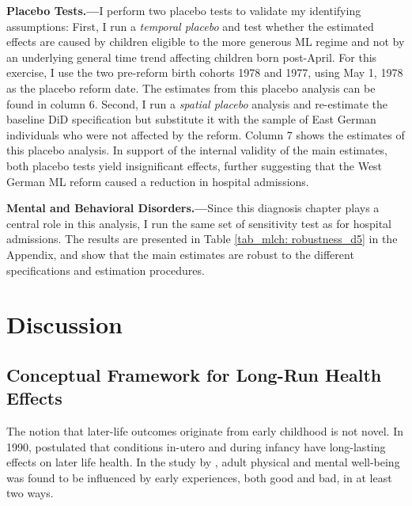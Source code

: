 \textbf{Placebo Tests.---}I perform two placebo tests to validate my identifying assumptions: First, I run a \textit{temporal placebo} and test whether the estimated effects are caused by children eligible to the more generous ML regime and not by an underlying general time trend affecting children born post-April. For this exercise, I use the two pre-reform birth cohorts 1978 and 1977, using May 1, 1978 as the placebo reform date. The estimates from this placebo analysis can be found in column 6. Second, I run a \textit{spatial placebo} analysis and re-estimate the baseline DiD specification but substitute it with the sample of East German individuals who were not affected by the reform. Column 7 shows the estimates of this placebo analysis. In support of the internal validity of the main estimates, both placebo tests yield insignificant effects, 
further suggesting that the West German ML reform caused a reduction in hospital admissions.\newline


\textbf{Mental and Behavioral Disorders.---}Since this diagnosis chapter plays a central role in this analysis, I run the same set of sensitivity test as for hospital admissions. The results are presented in Table \ref{tab_mlch: robustness_d5} in the Appendix, and show that the main estimates are robust to the different specifications and estimation procedures.




\bigskip
\section[Discussion]{Discussion}\label{sec_mlch:discussion}


\subsection{Conceptual Framework for Long-Run Health Effects} \label{rev_mlch: restructure_discussion_framework}
The notion that later-life outcomes originate from early childhood is not novel. In 1990, \citeauthor{Barker1990origins} postulated that conditions in-utero and during infancy have long-lasting effects on later life health. In the study by \cite{shonkoff2009neuroscience}, adult physical and mental well-being was found to be influenced by early experiences, both good and bad, in at least two ways.

